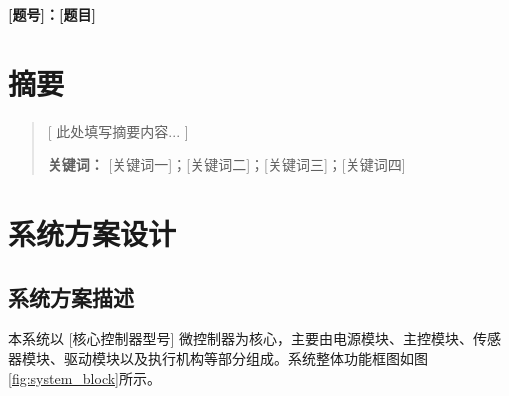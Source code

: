 \documentclass[UTF-8,zihao=-4]{ctexart}
\begin{document}
\begin{center}
    \huge \bfseries [题号]：[题目]
    \vspace{1cm}
\end{center}

\section*{摘要}
\begin{quote}
    \noindent
    [ 此处填写摘要内容... ]

    \vspace{1cm}
    \noindent
    \textbf{关键词：} [关键词一]；[关键词二]；[关键词三]；[关键词四] %
\end{quote}

\newpage
\tableofcontents
\newpage


\section{系统方案设计}
\subsection{系统方案描述}
    本系统以 [核心控制器型号] 微控制器为核心，主要由电源模块、主控模块、传感器模块、驱动模块以及执行机构等部分组成。系统整体功能框图如图\ref{fig:system_block}所示。
    
\end{document}
